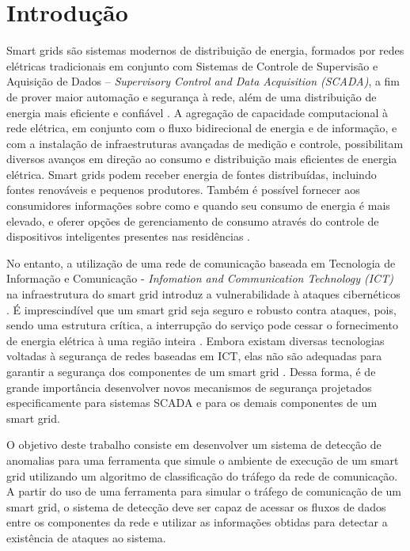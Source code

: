 \documentclass[12pt]{article}
\begin{document}
\section{Introdução}

	Smart grids são sistemas modernos de distribuição de energia, formados por redes elétricas tradicionais em conjunto com Sistemas de Controle de Supervisão e Aquisição de Dados – \textit{Supervisory Control and Data Acquisition (SCADA)}, a fim de prover maior automação e segurança à rede, além  de uma distribuição de energia mais eficiente e confiável \cite{2013survey}. A agregação de capacidade computacional à rede elétrica, em conjunto com o fluxo bidirecional de energia e de informação, e com a instalação de infraestruturas avançadas de medição e controle,  possibilitam diversos avanços em direção ao consumo e distribuição mais eficientes de energia elétrica.  Smart grids podem receber energia de fontes distribuídas, incluindo fontes renováveis e pequenos produtores. Também é possível fornecer aos consumidores informações sobre como e quando seu consumo de energia é mais elevado, e oferer opções de gerenciamento de consumo através do controle de dispositivos inteligentes presentes nas residências \cite{harb2013communication}.

No entanto, a utilização de uma rede de comunicação baseada em Tecnologia de Informação e Comunicação - \emph{Infomation and Communication Technology (ICT)} na infraestrutura do smart grid introduz a vulnerabilidade à ataques cibernéticos \cite{li2012securing}. É imprescindível que um smart grid seja seguro e robusto contra ataques, pois, sendo uma estrutura crítica, a interrupção do serviço pode cessar o fornecimento de energia elétrica à uma região inteira \cite{massoud2005toward}. Embora existam diversas tecnologias voltadas à segurança de redes baseadas em ICT, elas não são adequadas para garantir a segurança dos componentes de um smart grid \cite{carcano2011multidim}. Dessa forma, é de grande importância desenvolver novos mecanismos de segurança projetados especificamente para sistemas SCADA e para os demais componentes de um smart grid.

O objetivo deste trabalho consiste em desenvolver um sistema de detecção de anomalias para uma ferramenta que simule o ambiente de execução de um smart grid utilizando um algoritmo de classificação do tráfego da rede de comunicação. A partir do uso de uma ferramenta para simular o tráfego de comunicação de um smart grid, o sistema de detecção deve ser capaz de acessar os fluxos de dados entre os componentes da rede e utilizar as informações obtidas para detectar a existência de ataques ao sistema.
\end{document}
